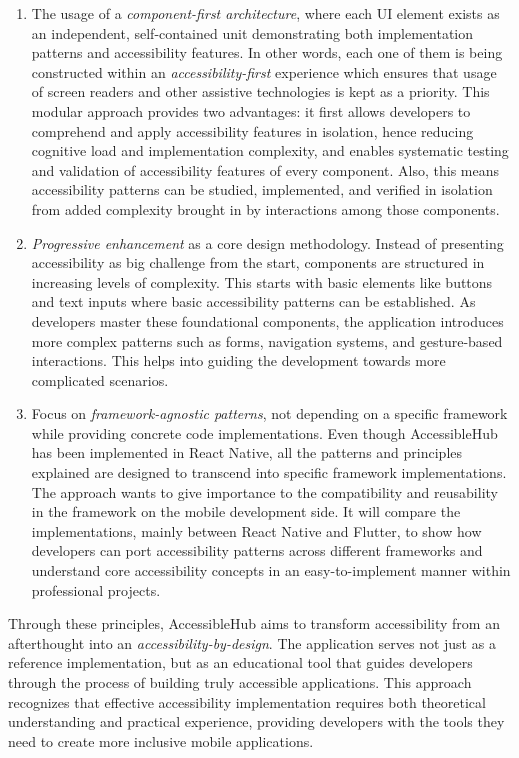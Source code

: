 \begin{enumerate}
    \item The usage of a \textit{component-first architecture}, where each UI element exists as an independent, self-contained unit demonstrating both implementation patterns and accessibility features. In other words, each one of them is being constructed within an \textit{accessibility-first} experience which ensures that usage of screen readers and other assistive technologies is kept as a priority. This modular approach provides two advantages: it first allows developers to comprehend and apply accessibility features in isolation, hence reducing cognitive load and implementation complexity, and enables systematic testing and validation of accessibility features of every component. Also, this means accessibility patterns can be studied, implemented, and verified in isolation from added complexity brought in by interactions among those components. 

    \item \textit{Progressive enhancement} as a core design methodology. Instead of presenting accessibility as big challenge from the start, components are structured in increasing levels of complexity. This starts with basic elements like buttons and text inputs where basic accessibility patterns can be established. As developers master these foundational components, the application introduces more complex patterns such as forms, navigation systems, and gesture-based interactions. This helps into guiding the development towards more complicated scenarios.

    \item Focus on \textit{framework-agnostic patterns}, not depending on a specific framework while providing concrete code implementations. Even though AccessibleHub has been implemented in React Native, all the patterns and principles explained are designed to transcend into specific framework implementations. The approach wants to give importance to the compatibility and reusability in the framework on the mobile development side. It will compare the implementations, mainly between React Native and Flutter, to show how developers can port accessibility patterns across different frameworks and understand core accessibility concepts in an easy-to-implement manner within professional projects. 
    
\end{enumerate}

Through these principles, AccessibleHub aims to transform accessibility from an afterthought into an \textit{accessibility-by-design}. The application serves not just as a reference implementation, but as an educational tool that guides developers through the process of building truly accessible applications. This approach recognizes that effective accessibility implementation requires both theoretical understanding and practical experience, providing developers with the tools they need to create more inclusive mobile applications.

